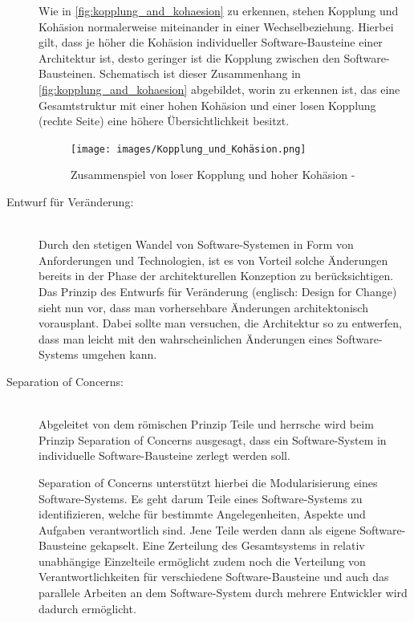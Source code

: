 \begin{description}
    Wie in \autoref{fig:kopplung_and_kohaesion} zu erkennen, stehen Kopplung und Kohäsion normalerweise miteinander in einer Wechselbeziehung. Hierbei gilt, dass je höher die Kohäsion individueller Software-Bausteine einer Architektur ist, desto geringer ist die Kopplung zwischen den Software-Bausteinen. Schematisch ist dieser Zusammenhang in \autoref{fig:kopplung_and_kohaesion} abgebildet, worin zu erkennen ist, das eine Gesamtstruktur mit einer hohen Kohäsion und einer losen Kopplung (rechte Seite) eine höhere Übersichtlichkeit besitzt.

    \begin{figure}[H]
        \centering
        \texttt{[image: images/Kopplung\_und\_Kohäsion.png]}
        \caption{Zusammenspiel von loser Kopplung und hoher Kohäsion - \cite{Vogel.2009}}
        \label{fig:kopplung_and_kohaesion}
    \end{figure}

    \item[Entwurf für Veränderung:]\hfill \\
    Durch den stetigen Wandel von Software-Systemen in Form von Anforderungen und Technologien, ist es von Vorteil solche Änderungen bereits in der Phase der architekturellen Konzeption zu berücksichtigen. Das Prinzip des Entwurfs für Veränderung (englisch: Design for Change) sieht nun vor, dass man vorhersehbare Änderungen architektonisch vorausplant. Dabei sollte man versuchen, die Architektur so zu entwerfen, dass man leicht mit den wahrscheinlichen Änderungen eines Software-Systems umgehen kann.

    \item[Separation of Concerns:]\hfill \\
    Abgeleitet von dem römischen Prinzip \glqq Teile und herrsche\grqq{} wird beim Prinzip Separation of Concerns ausgesagt, dass ein Software-System in individuelle Software-Bausteine zerlegt werden soll.

    Separation of Concerns unterstützt hierbei die Modularisierung eines Software-Systems. Es geht darum Teile eines Software-Systems zu identifizieren, welche für bestimmte Angelegenheiten, Aspekte und Aufgaben verantwortlich sind. Jene Teile werden dann als eigene Software-Bausteine gekapselt. Eine Zerteilung des Gesamtsystems in relativ unabhängige Einzelteile ermöglicht zudem noch die Verteilung von Verantwortlichkeiten für verschiedene Software-Bausteine und auch das parallele Arbeiten an dem Software-System durch mehrere Entwickler wird dadurch ermöglicht.


\end{description}
